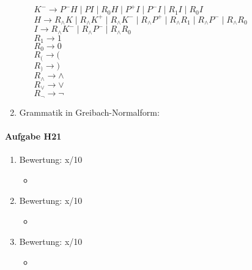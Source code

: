 \documentclass[11pt]{article}
\begin{document}
\begin{enumerate}
\begin{itemize}
\\\hspace*{6mm} $K^{-} \rightarrow P^{-} H\mid PI \mid R_{0}H \mid P^{+}I \mid P^{-}I \mid R_{1}I \mid R_{0}I$
\\\hspace*{6mm} $H \rightarrow R_{\wedge} K \mid R_{\wedge} K^{+} \mid R_{\wedge} K^{-} \mid R_{\wedge} P^{+} \mid R_{\wedge} R_{1} \mid R_{\wedge} P^{-} \mid R_{\wedge} R_{0}$
\\\hspace*{6mm} $I \rightarrow R_{\wedge} K^{-} \mid R_{\wedge} P^{-} \mid R_{\wedge}R_{0}$
\\\hspace*{6mm} $R_{1} \rightarrow 1$
\\\hspace*{6mm} $R_{0} \rightarrow 0$
\\\hspace*{6mm} $R_{(} \rightarrow ($
\\\hspace*{6mm} $R_{)} \rightarrow )$
\\\hspace*{6mm} $R_{\wedge} \rightarrow \wedge$
\\\hspace*{6mm} $R_{\vee} \rightarrow \vee$
\\\hspace*{6mm} $R_{\neg} \rightarrow \neg$
\end{itemize}
\item Grammatik in Greibach-Normalform:
\end{enumerate}


\paragraph{Aufgabe H21}
\begin{enumerate}[label=\alph*)]
\item Bewertung: x/10
\begin{itemize}
\item 
\end{itemize}

\item Bewertung: x/10
\begin{itemize}
\item
\end{itemize}

\item Bewertung: x/10
\begin{itemize}
\item
\end{itemize}
\end{enumerate}
\end{document}
